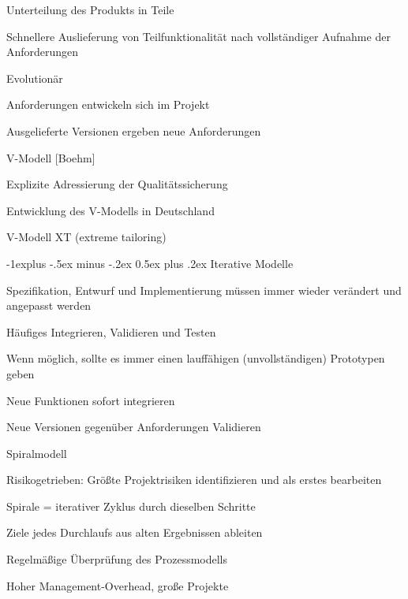 \documentclass[a4paper]{article}
\makeatletter
\renewcommand{\subsection}{\@startsection{subsection}{2}{0mm}%
                                {-1explus -.5ex minus -.2ex}%
                                {0.5ex plus .2ex}%
                                {\normalfont\normalsize\bfseries}}
\makeatother
\begin{document}
\begin{multicols}{3}
\begin{itemize*}
    \begin{itemize*}
      \item Unterteilung des Produkts in Teile
      \item Schnellere Auslieferung von Teilfunktionalität nach vollständiger Aufnahme der Anforderungen
    \end{itemize*}
    \item Evolutionär
    \begin{itemize*}
      \item Anforderungen entwickeln sich im Projekt
      \item Ausgelieferte Versionen ergeben neue Anforderungen
    \end{itemize*}
    \item V-Modell [Boehm]
    \begin{itemize*}
      \item Explizite Adressierung der Qualitätssicherung
      \item Entwicklung des V-Modells in Deutschland
      \item V-Modell XT (extreme tailoring)
    \end{itemize*}
  \end{itemize*}

  \subsection{Iterative Modelle}
  \begin{itemize*}
    \item Spezifikation, Entwurf und Implementierung müssen immer wieder verändert und angepasst werden
    \item Häufiges Integrieren, Validieren und Testen
    \item Wenn möglich, sollte es immer einen lauffähigen (unvollständigen) Prototypen geben
    \item Neue Funktionen sofort integrieren
    \item Neue Versionen gegenüber Anforderungen Validieren
  \end{itemize*}

  Spiralmodell
  \begin{itemize*}
    \item Risikogetrieben: Größte Projektrisiken identifizieren und als erstes bearbeiten
    \item Spirale = iterativer Zyklus durch dieselben Schritte
    \item Ziele jedes Durchlaufs aus alten Ergebnissen ableiten
    \item Regelmäßige Überprüfung des Prozessmodells
    \item Hoher Management-Overhead, große Projekte
  \end{itemize*}


\end{multicols}
\end{document}
